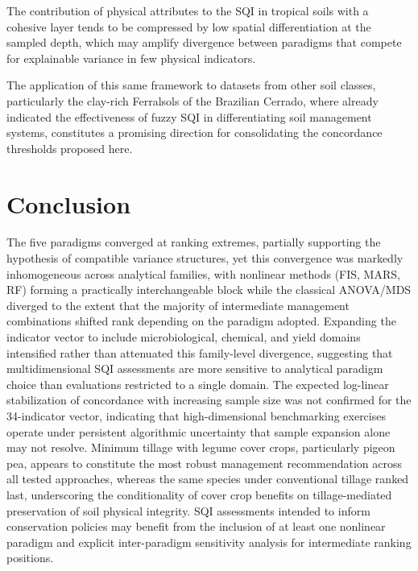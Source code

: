 \documentclass[pdflatex,sn-basic]{sn-jnl}%
\begin{document}
The contribution of physical attributes to the SQI in tropical soils with a cohesive layer tends to be compressed by low spatial differentiation at the sampled depth, which may amplify divergence between paradigms that compete for explainable variance in few physical indicators.

The application of this same framework to datasets from other soil classes, particularly the clay-rich Ferralsols of the Brazilian Cerrado, where \cite{DosSantos2021} already indicated the effectiveness of fuzzy SQI in differentiating soil management systems, constitutes a promising direction for consolidating the concordance thresholds proposed here.


\section{Conclusion}\label{sec:conclusion}

The five paradigms converged at ranking extremes, partially supporting the hypothesis of compatible variance structures, yet this convergence was markedly inhomogeneous across analytical families, with nonlinear methods (FIS, MARS, RF) forming a practically interchangeable block while the classical ANOVA/MDS diverged to the extent that the majority of intermediate management combinations shifted rank depending on the paradigm adopted. Expanding the indicator vector to include microbiological, chemical, and yield domains intensified rather than attenuated this family-level divergence, suggesting that multidimensional SQI assessments are more sensitive to analytical paradigm choice than evaluations restricted to a single domain. The expected log-linear stabilization of concordance with increasing sample size was not confirmed for the 34-indicator vector, indicating that high-dimensional benchmarking exercises operate under persistent algorithmic uncertainty that sample expansion alone may not resolve. Minimum tillage with legume cover crops, particularly pigeon pea, appears to constitute the most robust management recommendation across all tested approaches, whereas the same species under conventional tillage ranked last, underscoring the conditionality of cover crop benefits on tillage-mediated preservation of soil physical integrity. SQI assessments intended to inform conservation policies may benefit from the inclusion of at least one nonlinear paradigm and explicit inter-paradigm sensitivity analysis for intermediate ranking positions.
\end{document}
